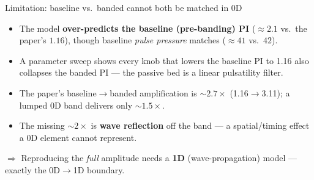 \documentclass[aspectratio=169]{beamer}
\begin{document}
\begin{frame}{Limitation: baseline vs.\ banded cannot both be matched in 0D}
\begin{itemize}
  \item The model \textbf{over-predicts the baseline (pre-banding) PI}
        ($\approx 2.1$ vs.\ the paper's $1.16$), though baseline \emph{pulse
        pressure} matches ($\approx 41$ vs.\ $42$).
  \item A parameter sweep shows every knob that lowers the baseline PI to 1.16
        \alert{also collapses the banded PI} --- the passive bed is a linear
        pulsatility filter.
  \item The paper's baseline$\to$banded amplification is $\sim\!2.7\times$
        (1.16$\to$3.11); a lumped 0D band delivers only $\sim\!1.5\times$.
  \item The missing $\sim\!2\times$ is \textbf{wave reflection} off the band ---
        a spatial/timing effect a 0D element cannot represent.
\end{itemize}
\vspace{0.5em}
\centering\footnotesize
$\Rightarrow$ Reproducing the \emph{full} amplitude needs a \textbf{1D}
(wave-propagation) model --- exactly the 0D$\to$1D boundary.
\end{frame}
\end{document}

